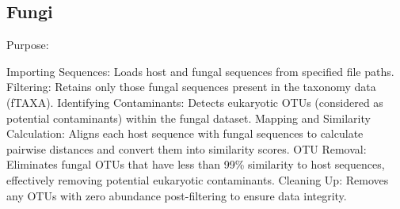 \documentclass[
  11pt,
]{article}
\begin{document}
\subsection{Fungi}\label{fungi}

Purpose:

Importing Sequences: Loads host and fungal sequences from specified file
paths. Filtering: Retains only those fungal sequences present in the
taxonomy data (fTAXA). Identifying Contaminants: Detects eukaryotic OTUs
(considered as potential contaminants) within the fungal dataset.
Mapping and Similarity Calculation: Aligns each host sequence with
fungal sequences to calculate pairwise distances and convert them into
similarity scores. OTU Removal: Eliminates fungal OTUs that have less
than 99\% similarity to host sequences, effectively removing potential
eukaryotic contaminants. Cleaning Up: Removes any OTUs with zero
abundance post-filtering to ensure data integrity.
\end{document}
